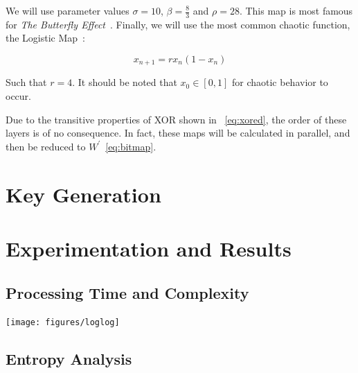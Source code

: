 \documentclass[conference]{IEEEtran}
\begin{document}
\noindent We will use parameter values $\sigma=10$, $\beta=\frac{8}{3}$ and $\rho=28$.
This map is most famous for \textit{The Butterfly Effect}~\cite{Alligood}.
Finally, we will use the most common chaotic function, the Logistic Map~\cite{Qin2017}:

\begin{equation}\label{eq:Logistic}
    x_{n+1} = r x_n (1 - x_n)
\end{equation}

\noindent Such that $r=4$.
It should be noted that $x_0 \in [0,1]$ for chaotic behavior to occur.

Due to the transitive properties of XOR shown in ~\eqref{eq:xored}, the order of these layers is of no consequence.
In fact, these maps will be calculated in parallel, and then be reduced to $W^\prime$~\eqref{eq:bitmap}.

\section{Key Generation}\label{subsec:key-generation}

\section{Experimentation and Results}\label{sec:experimentation-and-results}

\subsection{Processing Time and Complexity}\label{subsec:processing-time-and-complexity}

\texttt{[image: figures/loglog]}

\subsection{Entropy Analysis}\label{subsec:entropy-analysis}
\end{document}
